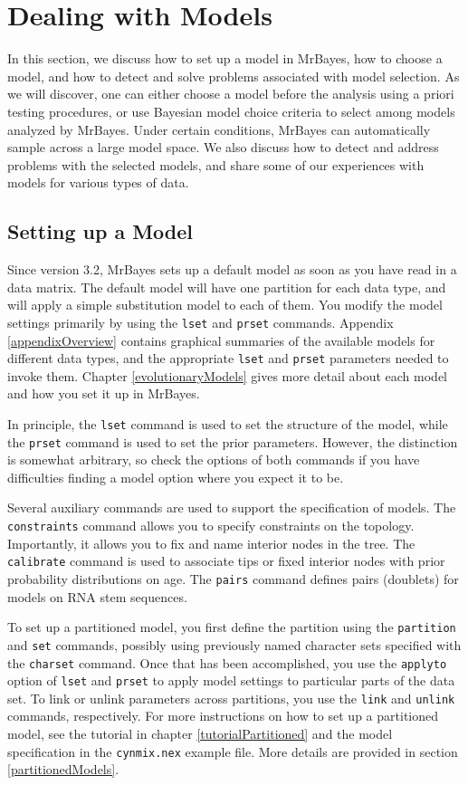 \documentclass[12pt]{book}
\begin{document}
\section{Dealing with Models}

In this section, we discuss how to set up a model in MrBayes, how to choose a model, and how to
detect and solve problems associated with model selection. As we will discover, one can either
choose a model before the analysis using a priori testing procedures, or use Bayesian model choice
criteria to select among models analyzed by MrBayes. Under certain conditions, MrBayes can
automatically sample across a large model space. We also discuss how to detect and address problems
with the selected models, and share some of our experiences with models for various types of data.

\subsection{Setting up a Model}

Since version 3.2, MrBayes sets up a default model as soon as you have read in a data matrix. The
default model will have one partition for each data type, and will apply a simple substitution
model to each of them. You modify the model settings primarily by using the \texttt{lset} and
\texttt{prset} commands. Appendix \ref{appendixOverview} contains graphical summaries of the
available models for different data types, and the appropriate \texttt{lset} and \texttt{prset}
parameters needed to invoke them. Chapter \ref{evolutionaryModels} gives more detail about each
model and how you set it up in MrBayes.

In principle, the \texttt{lset} command is used to set the structure of the model, while the
\texttt{prset} command is used to set the prior parameters. However, the distinction is somewhat
arbitrary, so check the options of both commands if you have difficulties finding a model option
where you expect it to be.

Several auxiliary commands are used to support the specification of models. The
\texttt{constraints} command allows you to specify constraints on the topology. Importantly, it
allows you to fix and name interior nodes in the tree. The \texttt{calibrate} command is used to
associate tips or fixed interior nodes with prior probability distributions on age. The
\texttt{pairs} command defines pairs (doublets) for models on RNA stem sequences.

To set up a partitioned model, you first define the partition using the \texttt{partition} and
\texttt{set} commands, possibly using previously named character sets specified with the
\texttt{charset} command. Once that has been accomplished, you use the \texttt{applyto} option of
\texttt{lset} and \texttt{prset} to apply model settings to particular parts of the data set. To
link or unlink parameters across partitions, you use the \texttt{link} and \texttt{unlink}
commands, respectively. For more instructions on how to set up a partitioned model, see the
tutorial in chapter \ref{tutorialPartitioned} and the model specification in the
\texttt{cynmix.nex} example file. More details are provided in section \ref{partitionedModels}.
\end{document}
